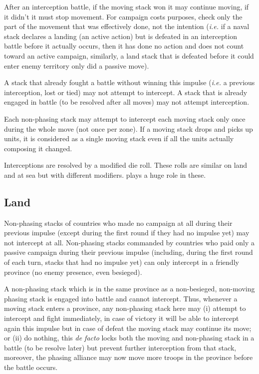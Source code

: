After an interception battle, if the moving stack won it may continue moving,
if it didn't it must stop movement. For campaign costs purposes, check only
the part of the movement that was effectively done, not the intention
(\emph{i.e.}  if a naval stack declares a landing (an active action) but is
defeated in an interception battle before it actually occurs, then it has done
no action and does not count toward an active campaign, similarly, a land
stack that is defeated before it could enter enemy territory only did a
passive move).

A stack that already fought a battle without winning this impulse (\emph{i.e.}
a previous interception, lost or tied) may not attempt to intercept. A stack
that is already engaged in battle (to be resolved after all moves) may not
attempt interception.

Each non-phasing stack may attempt to intercept each moving stack only once
during the whole move (not once per zone). If a moving stack drops and picks
up units, it is considered as a single moving stack even if all the units
actually composing it changed.

Interceptions are resolved by a modified die roll. These rolls are similar on
land and at sea but with different modifiers. \Man plays a huge role in these.

\subsection{Land}
Non-phasing stacks of countries who made no campaign at all during their
previous impulse (except during the first round if they had no impulse yet)
may not intercept at all. Non-phasing stacks commanded by countries who paid
only a passive campaign during their previous impulse (including, during the
first round of each turn, stacks that had no impulse yet) can only intercept
in a friendly province (no enemy presence, even besieged).

A non-phasing stack which is in the same province as a non-besieged,
non-moving phasing stack is engaged into battle and cannot intercept. Thus,
whenever a moving stack enters a province, any non-phasing stack here may (i)
attempt to intercept and fight immediately, in case of victory it will be able
to intercept again this impulse but in case of defeat the moving stack may
continue its move; or (ii) do nothing, this \emph{de facto} locks both the
moving and non-phasing stack in a battle (to be resolve later) but prevent
further interception from that stack, moreover, the phasing alliance may now
move more troops in the province before the battle occurs.

